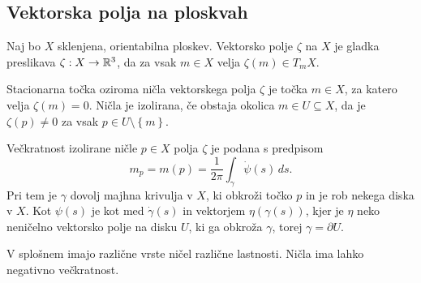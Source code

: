 \subsection{Vektorska polja na ploskvah} 

\begin{definicija}
\label{def_vektorsko_polje}
Naj bo $X$ sklenjena, orientabilna ploskev. Vektorsko polje $\zeta$ na $X$ je gladka preslikava $\zeta: X \to  \mathbb{R} ^3$, da za vsak $m \in  X$ velja $\zeta(m) \in  T_mX$.
\end{definicija}

\begin{definicija}
\label{def_stacionarna_tocka_vektorskega_polja}
Stacionarna točka oziroma ničla vektorskega polja $\zeta$ je točka $m \in  X$, za katero velja $\zeta(m) = 0$. Ničla je izolirana, če obstaja okolica $m \in  U \subseteq X$, da je $\zeta(p) \neq 0$ za vsak $p \in  U \setminus \left\{ m\right\} $.
\end{definicija}

\begin{definicija}
\label{def_veckratnost_izolirane_nicle}
Večkratnost izolirane ničle $p \in  X$ polja $\zeta$ je podana s predpisom \begin{equation*}
m_p = m(p) = \frac{1}{2\pi} \int_{\gamma} \dot{\psi}(s) \, ds. 
\end{equation*}  
Pri tem je $\gamma$ dovolj majhna krivulja v $X$, ki obkroži točko $p$ in je rob nekega diska v $X$. Kot $\psi(s)$ je kot med
$\dot{\gamma}(s)$ in vektorjem $\eta(\gamma(s))$, kjer je $\eta$ neko neničelno vektorsko polje na disku $U$, ki ga obkroža $\gamma$, torej $\gamma = \partial U$.  
\end{definicija}

\begin{opomba}
    V splošnem imajo različne vrste ničel različne lastnosti. Ničla ima lahko negativno večkratnost.
    \end{opomba}

